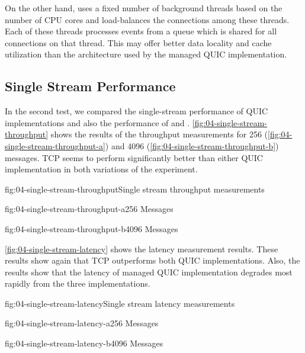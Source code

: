 On the other hand, \libmsquic{} uses a fixed number of background threads based on the number of CPU
cores and load-balances the connections among these threads. Each of these threads processes events
from a queue which is shared for all connections on that thread. This may offer better data locality
and cache utilization than the architecture used by the managed QUIC implementation.

\subsection{Single Stream Performance}

In the second test, we compared the single-stream performance of QUIC implementations and also the
performance of \TcpClient{} and \SslStream{}. \autoref{fig:04-single-stream-throughput} shows the
results of the throughput measurements for \SI{256}{\byte}
(\autoref{fig:04-single-stream-throughput-a}) and \SI{4096}{\byte}
(\autoref{fig:04-single-stream-throughput-b}) messages. TCP seems to perform significantly better
than either QUIC implementation in both variations of the experiment.

\begin{myFigure}{fig:04-single-stream-throughput}{Single stream throughput measurements}
\begin{mySubfigure}{0.49\linewidth}{fig:04-single-stream-throughput-a}{\SI{256}{\byte} Messages}
\footnotesize

\end{mySubfigure}
\begin{mySubfigure}{0.49\linewidth}{fig:04-single-stream-throughput-b}{\SI{4096}{\byte} Messages}
\footnotesize

\end{mySubfigure}
\end{myFigure}

\autoref{fig:04-single-stream-latency} shows the latency measurement results. These results show
again that TCP outperforms both QUIC implementations. Also, the results show that the latency of
managed QUIC implementation degrades most rapidly from the three implementations.

\begin{myFigure}{fig:04-single-stream-latency}{Single stream latency measurements}
\begin{mySubfigure}{0.49\linewidth}{fig:04-single-stream-latency-a}{\SI{256}{\byte} Messages}
\footnotesize

\end{mySubfigure}
\begin{mySubfigure}{0.49\linewidth}{fig:04-single-stream-latency-b}{\SI{4096}{\byte} Messages}
\footnotesize

\end{mySubfigure}
\end{myFigure}

